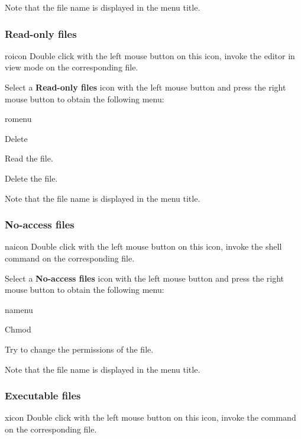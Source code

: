 Note that the file name is displayed in the menu title.


\subsubsection{Read-only files}
\begin{ICON}{roicon}
Double click with the left mouse button on this icon, invoke the editor in view
mode on the corresponding file.
\end{ICON}

Select a {\bf Read-only files} icon with the left mouse button and press
the right mouse button to obtain the following menu:

\begin{PAWf}{romenu}

\begin{DLsf}{Delete}
\item[View]         Read the file.
\item[Delete]       Delete the file.
\end{DLsf}
\end{PAWf}

Note that the file name is displayed in the menu title.


\subsubsection{No-access files}
\begin{ICON}{naicon}
Double click with the left mouse button on this icon, invoke the shell command
 on the corresponding file.
\end{ICON}

Select a {\bf No-access files} icon with the left mouse button and press
the right mouse button to obtain the following menu:

\begin{PAWf}{namenu}
\begin{DLsf}{Chmod}
\item[Chmod]         Try to change the permissions of the file.
\end{DLsf}
\end{PAWf}

Note that the file name is displayed in the menu title.


\subsubsection{Executable files}
\begin{ICON}{xicon}
Double click with the left mouse button on this icon, invoke the command
 on the corresponding file.
\end{ICON}

